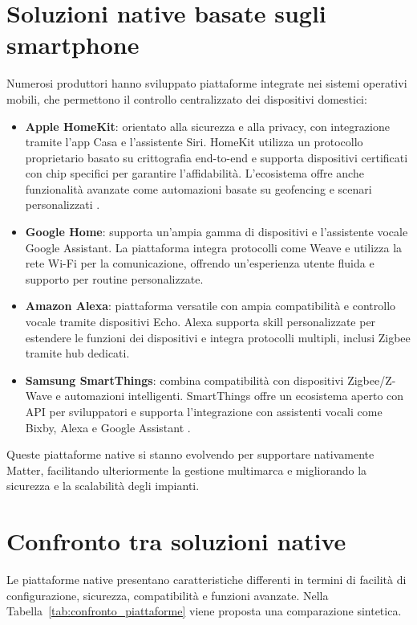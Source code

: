\section{Soluzioni native basate sugli smartphone}
Numerosi produttori hanno sviluppato piattaforme integrate nei sistemi operativi mobili, che permettono il controllo centralizzato dei dispositivi domestici:
\begin{itemize}
    \item \textbf{Apple HomeKit}: orientato alla sicurezza e alla privacy, con integrazione tramite l'app Casa e l'assistente Siri. HomeKit utilizza un protocollo proprietario basato su crittografia end-to-end e supporta dispositivi certificati con chip specifici per garantire l’affidabilità. L’ecosistema offre anche funzionalità avanzate come automazioni basate su geofencing e scenari personalizzati \cite{Apple2023}.
    \item \textbf{Google Home}: supporta un'ampia gamma di dispositivi e l'assistente vocale Google Assistant. La piattaforma integra protocolli come Weave e utilizza la rete Wi-Fi per la comunicazione, offrendo un’esperienza utente fluida e supporto per routine personalizzate.
    \item \textbf{Amazon Alexa}: piattaforma versatile con ampia compatibilità e controllo vocale tramite dispositivi Echo. Alexa supporta skill personalizzate per estendere le funzioni dei dispositivi e integra protocolli multipli, inclusi Zigbee tramite hub dedicati.
    \item \textbf{Samsung SmartThings}: combina compatibilità con dispositivi Zigbee/Z-Wave e automazioni intelligenti. SmartThings offre un ecosistema aperto con API per sviluppatori e supporta l’integrazione con assistenti vocali come Bixby, Alexa e Google Assistant \cite{Samsung2023}.
\end{itemize}

Queste piattaforme native si stanno evolvendo per supportare nativamente Matter, facilitando ulteriormente la gestione multimarca e migliorando la sicurezza e la scalabilità degli impianti.

\section{Confronto tra soluzioni native}
Le piattaforme native presentano caratteristiche differenti in termini di facilità di configurazione, sicurezza, compatibilità e funzioni avanzate. Nella Tabella~\ref{tab:confronto_piattaforme} viene proposta una comparazione sintetica.

